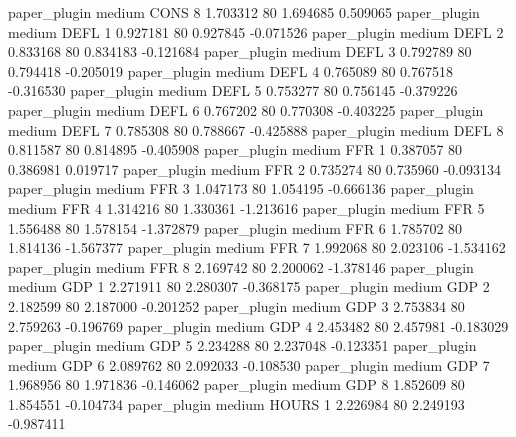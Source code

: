   paper_plugin     medium     CONS                 8  1.703312 80       1.694685           0.509065
  paper_plugin     medium     DEFL                 1  0.927181 80       0.927845          -0.071526
  paper_plugin     medium     DEFL                 2  0.833168 80       0.834183          -0.121684
  paper_plugin     medium     DEFL                 3  0.792789 80       0.794418          -0.205019
  paper_plugin     medium     DEFL                 4  0.765089 80       0.767518          -0.316530
  paper_plugin     medium     DEFL                 5  0.753277 80       0.756145          -0.379226
  paper_plugin     medium     DEFL                 6  0.767202 80       0.770308          -0.403225
  paper_plugin     medium     DEFL                 7  0.785308 80       0.788667          -0.425888
  paper_plugin     medium     DEFL                 8  0.811587 80       0.814895          -0.405908
  paper_plugin     medium      FFR                 1  0.387057 80       0.386981           0.019717
  paper_plugin     medium      FFR                 2  0.735274 80       0.735960          -0.093134
  paper_plugin     medium      FFR                 3  1.047173 80       1.054195          -0.666136
  paper_plugin     medium      FFR                 4  1.314216 80       1.330361          -1.213616
  paper_plugin     medium      FFR                 5  1.556488 80       1.578154          -1.372879
  paper_plugin     medium      FFR                 6  1.785702 80       1.814136          -1.567377
  paper_plugin     medium      FFR                 7  1.992068 80       2.023106          -1.534162
  paper_plugin     medium      FFR                 8  2.169742 80       2.200062          -1.378146
  paper_plugin     medium      GDP                 1  2.271911 80       2.280307          -0.368175
  paper_plugin     medium      GDP                 2  2.182599 80       2.187000          -0.201252
  paper_plugin     medium      GDP                 3  2.753834 80       2.759263          -0.196769
  paper_plugin     medium      GDP                 4  2.453482 80       2.457981          -0.183029
  paper_plugin     medium      GDP                 5  2.234288 80       2.237048          -0.123351
  paper_plugin     medium      GDP                 6  2.089762 80       2.092033          -0.108530
  paper_plugin     medium      GDP                 7  1.968956 80       1.971836          -0.146062
  paper_plugin     medium      GDP                 8  1.852609 80       1.854551          -0.104734
  paper_plugin     medium    HOURS                 1  2.226984 80       2.249193          -0.987411
